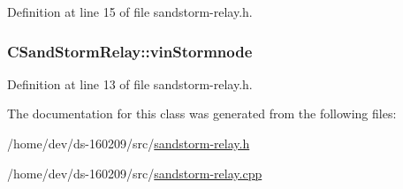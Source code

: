 Definition at line 15 of file sandstorm-\/relay.\+h.

\hypertarget{class_c_sand_storm_relay_ae9a99cafdc4ed5a56cfac7b141d0c98d}{}
\subsubsection[{vin\+Stormnode}]{ C\+Sand\+Storm\+Relay\+::vin\+Stormnode}\label{class_c_sand_storm_relay_ae9a99cafdc4ed5a56cfac7b141d0c98d}


Definition at line 13 of file sandstorm-\/relay.\+h.



The documentation for this class was generated from the following files\+:\begin{DoxyCompactItemize}
\item 
/home/dev/ds-\/160209/src/\hyperlink{sandstorm-relay_8h}{sandstorm-\/relay.\+h}\item 
/home/dev/ds-\/160209/src/\hyperlink{sandstorm-relay_8cpp}{sandstorm-\/relay.\+cpp}\end{DoxyCompactItemize}
